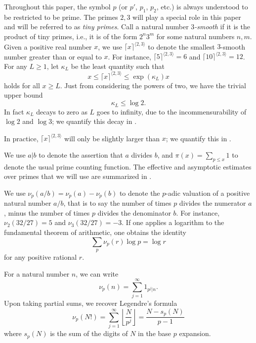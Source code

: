 \documentclass[12pt,a4paper,reqno]{amsart}
\numberwithin{equation}{section}
\theoremstyle{plain}
\theoremstyle{definition}
\begin{document}
Throughout this paper, the symbol $p$ (or $p'$, $p_1$, $p_2$, etc.) is always understood to be restricted to be prime.  The primes $2,3$ will play a special role in this paper and will be referred to as \emph{tiny primes}. 
Call a natural number \emph{$3$-smooth} if it is the product of tiny primes, i.e., it is of the form $2^n 3^m$ for some natural numbers $n,m$.  Given a positive real number $x$, we use $\lceil x \rceil^{\langle 2,3 \rangle}$ to denote the smallest $3$-smooth number greater than or equal to $x$.  For instance, $\lceil 5 \rceil^{\langle 2,3 \rangle} = 6$ and $\lceil 10 \rceil^{\langle 2,3 \rangle} = 12$. 
For any $L \geq 1$, let $\kappa_L$ be the least quantity such that
\begin{equation}\label{kappa-def}  
  x \leq \lceil x \rceil^{\langle 2,3\rangle} \leq \exp(\kappa_L) x 
\end{equation}
holds for all $x \geq L$. Just from considering the powers of two, we have the trivial upper bound
\begin{equation}\label{kl-triv}
  \kappa_L \leq \log 2.
\end{equation}
In fact $\kappa_L$ decays to zero as $L$ goes to infinity, due to the incommensurability of $\log 2$ and $\log 3$; we quantify this decay in . 

In practice, $\lceil x \rceil^{\langle 2,3 \rangle}$ will only be slightly larger than $x$; we quantify this in .

We use $a|b$ to denote the assertion that $a$ divides $b$, and $\pi(x) = \sum_{p \leq x} 1$ to denote the usual prime counting function. The effective and asymptotic estimates over primes that we will use are summarized in .

We use $\nu_p(a/b) = \nu_p(a)-\nu_p(b)$ to denote the $p$-adic valuation of a positive natural number $a/b$, that is to say the number of times $p$ divides the numerator $a$, minus the number of times $p$ divides the denominator $b$.  For instance, $\nu_2(32/27)=5$ and $\nu_3(32/27)=-3$. 
If one applies a logarithm to the fundamental theorem of arithmetic, one obtains the identity
\begin{equation}\label{ftoa}
  \sum_p \nu_p(r) \log p = \log r
\end{equation}
for any positive rational $r$.  

For a natural number $n$, we can write
\begin{equation}\label{nup-form} 
  \nu_p(n) = \sum_{j=1}^\infty 1_{p^j|n}.
\end{equation}
Upon taking partial sums, we recover Legendre's formula
\begin{equation}\label{legendre}
  \nu_p(N!) = \sum_{j=1}^\infty \left\lfloor \frac{N}{p^j} \right\rfloor = \frac{N - s_p(N)}{p-1}
\end{equation}
where $s_p(N)$ is the sum of the digits of $N$ in the base $p$ expansion.
\end{document}
